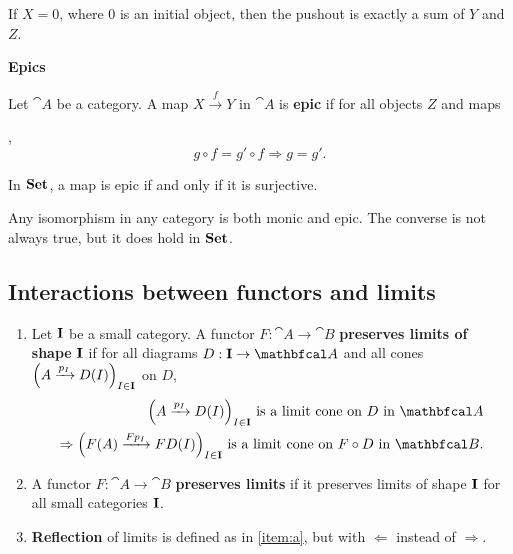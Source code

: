 \begin{example}
    If $X=0$, where $0$ is an initial object, then the pushout is exactly a sum of $Y$ and $Z$.
\end{example}

\begin{center}
    \textbf{Epics}
\end{center}
\begin{definition}
    Let $\cat{A}$ be a category. A map $X\xrightarrow{f}Y$ in $\cat{A}$ is \textbf{epic} if for all objects $Z$ and maps ,
    \begin{equation*}
        g\circ f=g'\circ f \Rightarrow g=g'.
    \end{equation*}
\end{definition}

\begin{example}
    In $\mathbf{Set}$, a map is epic if and only if it is surjective.
\end{example}
Any isomorphism in any category is both monic and epic. The converse is not always true, but it does hold in $\mathbf{Set}$.

\subsection{Interactions between functors and limits}
\begin{definition}
    \begin{enumerate}[label=(\alph*)]
        \item\label{item:a} Let $\mathbf{I}$ be a small category. A functor $F:\cat{A} \to \cat{B}$ \textbf{preserves limits of shape} $\mathbf{I}$ if for all diagrams $D:\bcat{I}\to\cat{A}$ and all cones $\Big( A\xrightarrow{p_I} D(I) \Big)_{I\in\mathbf{I}}$ on $D$,
            \begin{align*}
                \Big( A\xrightarrow{p_I} D(I) \Big)_{I\in\bcat{I}} \text{ is a limit cone on } D \text{ in } \cat{A}\\
                \Rightarrow \Big( F(A) \xrightarrow{Fp_I} FD(I) \Big)_{I\in\bcat{I}} \text{ is a limit cone on } F\circ D \text{ in } \cat{B}.
            \end{align*}
        \item A functor $F:\cat{A}\to\cat{B}$ \textbf{preserves limits} if it preserves limits of shape $\mathbf{I}$ for all small categories $\mathbf{I}$.
        \item \textbf{Reflection} of limits is defined as in \ref{item:a}, but with $\Leftarrow$ instead of $\Rightarrow$.
    \end{enumerate}
\end{definition}

